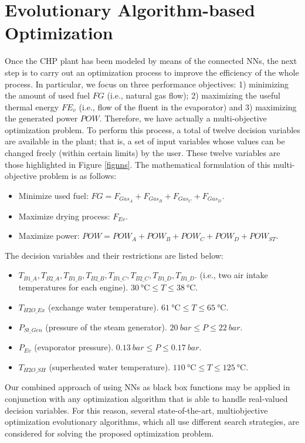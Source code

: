 \section{Evolutionary Algorithm-based Optimization}
\label{sec:optimization}
Once the CHP plant has been modeled by means of the connected NNs, the next step is to  carry out an optimization process to improve the efficiency of the whole process. In particular, we focus on three performance objectives: 1) minimizing the amount of used fuel $FG$ (i.e., natural gas flow); 2) maximizing the useful thermal energy $FE_v$ (i.e., flow of the fluent in the evaporator) and 3) maximizing the generated power $POW$. Therefore, we have actually a multi-objective optimization problem. To perform this process, a total of twelve decision variables  are available in the plant; that is, a set of input variables whose values can be changed freely (within certain limits) by the user. These twelve variables are those highlighted in Figure  \ref{fignns}. The mathematical formulation of this multi-objective problem is as follows:
%
\begin{itemize}[-]
	\item Minimize used fuel: $FG = F_{Gas_A} + F_{Gas_B} + F_{Gas_C} + F_{Gas_D}$.
	\item Maximize drying process: $F_{Ev}$.
	\item Maximize power: $POW = POW_A + POW_B + POW_C + POW_D + POW_{ST}$.
\end{itemize}
%
The decision variables and their restrictions are listed below:
%
\begin{itemize}[-]
	\item $T_{B1\_A}, T_{B2\_A}, T_{B1\_B}, T_{B2\_B}, T_{B1\_C}, T_{B2\_C}, T_{B1\_D}, T_{B1\_D}$. (i.e., two air intake temperatures for each engine). $\SI{30}{\celsius} \leq T  \leq  \SI{38}{\celsius}$.
	\item $T_{H2O\_Ex}$ (exchange water temperature). $\SI{61}{\celsius}  \leq T  \leq  \SI{65}{\celsius}$.
	\item $P_{St\_Gen}$ (pressure of the steam generator). $\SI{20}{bar}  \leq  P  \leq  \SI{22}{bar}$.
	\item $P_{Ev}$ (evaporator pressure). $\SI{0.13}{bar}  \leq  P  \leq  \SI{0.17}{bar}$.
	\item $T_{H2O\_SH}$ (superheated water temperature). $\SI{110}{\celsius}  \leq  T  \leq  \SI{125}{\celsius}$.
\end{itemize}

Our combined approach of using NNs as black box functions may be applied in conjunction with any optimization algorithm that is able to handle real-valued decision variables. For this reason, several state-of-the-art, multiobjective optimization evolutionary algorithms, which all use different search strategies, are considered for solving the proposed optimization problem.

